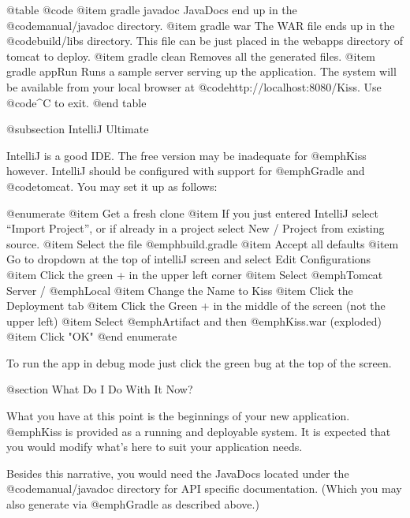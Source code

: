 @table @code
@item gradle javadoc
JavaDocs end up in the @code{manual/javadoc} directory.
@item gradle war
The WAR file ends up in the @code{build/libs} directory.  This file can be just placed in the webapps directory of tomcat to deploy.
@item gradle clean
Removes all the generated files.
@item gradle appRun
Runs a sample server serving up the application.  The system will be
available from your local browser at
@code{http://localhost:8080/Kiss}.  Use @code{^C} to exit.
@end table

@subsection IntelliJ Ultimate

IntelliJ is a good IDE.  The free version may be inadequate for
@emph{Kiss} however.  IntelliJ should be configured with support for
@emph{Gradle} and @code{tomcat}.  You may set it up as follows:

@enumerate
@item
Get a fresh clone
@item
If you just entered IntelliJ select ``Import Project'', or if already in a project select New / Project from existing source.
@item
Select the file @emph{build.gradle}
@item
Accept all defaults
@item
Go to dropdown at the top of intelliJ screen and select Edit Configurations
@item
Click the green + in the upper left corner
@item
Select @emph{Tomcat Server} / @emph{Local}
@item
Change the Name to Kiss
@item
Click the Deployment tab
@item
Click the Green + in the middle of the screen (not the upper left)
@item
Select @emph{Artifact} and then @emph{Kiss.war} (exploded)
@item
Click "OK"
@end enumerate

To run the app in debug mode just click the green bug at the top of the screen.


@section What Do I Do With It Now?

What you have at this point is the beginnings of your new application.
@emph{Kiss} is provided as a running and deployable system.  It is
expected that you would modify what's here to suit your application
needs.

Besides this narrative, you would need the JavaDocs located under the
@code{manual/javadoc} directory for API specific documentation.
(Which you may also generate via @emph{Gradle} as described above.)
